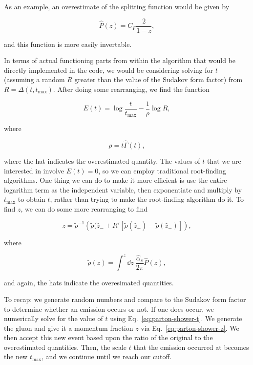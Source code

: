 As an example, an overestimate of the splitting function would be given by

\begin{equation}
  \hat{P}(z) = C_F \frac{2}{1-z},
\end{equation}

and this function is more easily invertable.

In terms of actual functioning parts from within the algorithm that would be directly implemented in the code, we would be considering solving for $t$ (assuming a random $R$ greater than the value of the Sudakov form factor) from $R = \Delta(t,t_{\mathrm{max}})$. After doing some rearranging, we find the function

\begin{equation}
  E(t) = \log \frac{t}{t_{\mathrm{max}}} - \frac{1}{\rho} \log R,\label{eq:parton-shower-t}
\end{equation}

where

\begin{equation}
  \rho = t\hat{\Gamma}(t),
\end{equation}

where the hat indicates the overestimated quantity. The values of $t$ that we are interested in involve $E(t) = 0$, so we can employ traditional root-finding algorithms. One thing we can do to make it more efficient is use the entire logarithm term as the independent variable, then exponentiate and multiply by $t_{\mathrm{max}}$ to obtain $t$, rather than trying to make the root-finding algorithm do it. To find $z$, we can do some more rearranging to find

\begin{equation}
  z = \tilde{\rho}^{-1}\left( \tilde{\rho}(\hat{z}_- + R'[\tilde{\rho}(\hat{z}_+) - \tilde{\rho}(\hat{z}_-)] \right),\label{eq:parton-shower-z}
\end{equation}

where

\begin{equation}
  \tilde{\rho}(z) = \int^{z} \dd z \; \frac{\hat{\alpha}_s}{2\pi}\hat{P}(z),
\end{equation}

and again, the hats indicate the overesimated quantities.

To recap: we generate random numbers and compare to the Sudakov form factor to determine whether an emission occurs or not. If one does occur, we numerically solve for the value of $t$ using Eq.~\eqref{eq:parton-shower-t}. We generate the gluon and give it a momentum fraction $z$ via Eq.~\eqref{eq:parton-shower-z}. We then accept this new event based upon the ratio of the original to the overestimated quantities. Then, the scale $t$ that the emission occurred at becomes the new $t_{\mathrm{max}}$, and we continue until we reach our cutoff.

